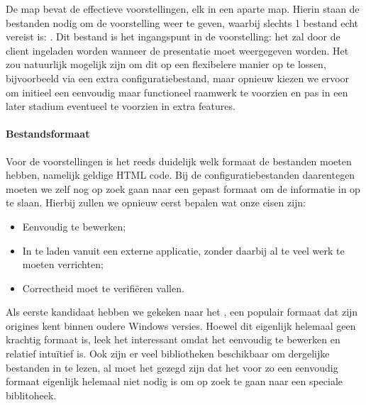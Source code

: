 De  map bevat de effectieve voorstellingen, elk in een aparte map. Hierin staan de bestanden nodig om de voorstelling weer te geven, waarbij slechts 1 bestand echt vereist is: . Dit bestand is het ingangspunt in de voorstelling: het zal door de client ingeladen worden wanneer de presentatie moet weergegeven worden. Het zou natuurlijk mogelijk zijn om dit op een flexibelere manier op te lossen, bijvoorbeeld via een extra configuratiebestand, maar opnieuw kiezen we ervoor om initieel een eenvoudig maar functioneel raamwerk te voorzien en pas in een later stadium eventueel te voorzien in extra features.

\paragraph{Bestandsformaat}

Voor de voorstellingen is het reeds duidelijk welk formaat de bestanden moeten hebben, namelijk geldige HTML code. Bij de configuratiebestanden daarentegen moeten we zelf nog op zoek gaan naar een gepast formaat om de informatie in op te slaan. Hierbij zullen we opnieuw eerst bepalen wat onze eisen zijn:
\begin{itemize}
  \item Eenvoudig te bewerken;
  \item In te laden vanuit een externe applicatie, zonder daarbij al te veel werk te moeten verrichten;
  \item Correctheid moet te verifiëren vallen.
\end{itemize}

Als eerste kandidaat hebben we gekeken naar het , een populair  formaat dat zijn origines kent binnen oudere Windows versies. Hoewel dit eigenlijk helemaal geen krachtig formaat is, leek het interessant omdat het eenvoudig te bewerken en relatief intuïtief is. Ook zijn er veel bibliotheken beschikbaar om dergelijke bestanden in te lezen, al moet het gezegd zijn dat het voor zo een eenvoudig formaat eigenlijk helemaal niet nodig is om op zoek te gaan naar een speciale biblitoheek.

